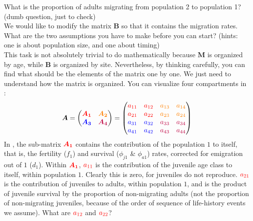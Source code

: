 \documentclass{article}\usepackage[]{graphicx}\usepackage[]{color}
\begin{document}
What is the proportion of adults migrating from population 2 to population 1? (dumb question, just to check)\\

We would like to modify the matrix $\boldsymbol{B}$ so that it contains the migration rates. \\
What are the two assumptions you have to make before you can start? 
(hints: one is about population size, and one about timing)\\%


This task is not absolutely trivial to do mathematically because $\boldsymbol{M}$ is organized by age, while $\boldsymbol{B}$ is organized by site. 
Nevertheless, by thinking carefully, you can find what should be the elements of the matrix one by one. We just need to understand how the matrix is organized.
You can visualize four compartments in :
\begin{align*}
\boldsymbol{A}=
\begin{pmatrix}
\boldsymbol{\color{red}{A_1}} & \boldsymbol{\color{orange}{A_2}} \\
\boldsymbol{\color{blue}{A_3}} & \boldsymbol{\color{purple}{A_4}}
\end{pmatrix}
=\begin{pmatrix}
  \color{red}{a_{11}} & \color{red}{a_{12}} & \color{orange}{a_{13}} & \color{orange}{a_{14}}\\
  \color{red}{a_{21}} & \color{red}{a_{22}} & \color{orange}{a_{23}} & \color{orange}{a_{24}}\\
  \color{blue}{a_{31}} & \color{blue}{a_{32}} & \color{purple}{a_{33}} & \color{purple}{a_{34}}\\
  \color{blue}{a_{41}} & \color{blue}{a_{42}} & \color{purple}{a_{43}} & \color{purple}{a_{44}}\\
\end{pmatrix}
\end{align*}
In {\color{red}{red}}, the sub-matrix $\boldsymbol{\color{red}{A_1}}$ contains the contribution of the population $1$ to itself, that is, the fertility ($f_1$) and survival ($\phi_{j1}$ & $\phi_{a1}$) rates, corrected for emigration out of $1$ ($d_1$). Within $\boldsymbol{\color{red}{A_1}}$, $\color{red}{a_{11}}$ is the contribution of the juvenile age class to itself, within population $1$. Clearly this is zero, for juveniles do not reproduce. $\color{red}{a_{21}}$ is the contribution of juveniles to adults, within population $1$, and is the product of juvenile survival by the proportion of non-migrating adults (not the proportion of non-migrating juveniles, because of the order of sequence of life-history events we assume). 
What are $\color{red}{a_{12}}$ and $\color{red}{a_{22}}$?\\
\end{document}
